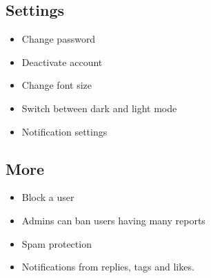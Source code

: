 \documentclass[journal,12pt,onecolumn]{IEEEtran}
\begin{document}
\subsection*{\textbf{Settings}}
\begin{itemize}
    \item Change password
    \item Deactivate account
    \item Change font size
    \item Switch between dark and light mode
    \item Notification settings
\end{itemize}
\subsection*{\textbf{More}}
%
\begin{itemize}
    \item Block a user
    \item Admins can ban users having many reports
    \item Spam protection
    \item Notifications from replies, tags and likes.
\end{itemize}
\end{document}
